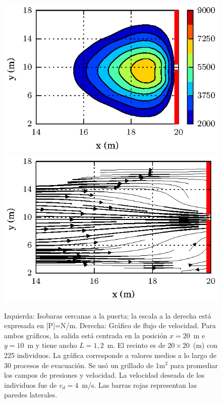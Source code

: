 \begin{figure}[H]
    \centering
    \includegraphics[scale=1]{figuras/fig4_version0.eps}
    \hfill
        \includegraphics[scale=1]{figuras/flujo_door_1_2m.eps}
    \caption[width=5cm]{Izquierda: Isobaras cercanas a la puerta; la escala a la derecha está expresada en [P]=N/m. Derecha: Gráfico de flujo de velocidad. Para ambos gráficos, la salida está centrada en la posición $x=20$~m e $y=10$~m y tiene ancho $L=1,2$~m. El recinto es de $20\times 20$~(m) con 225 individuos. La gráfica corresponde a valores medios a lo largo de 30 procesos de evacuación. Se usó un grillado de 1m$^2$ para promediar los campos de presiones y velocidad. La velocidad deseada de los individuos fue de $v_d=4$~m/s. Las barras rojas representan las paredes laterales.}
    \label{isobaras_flujo_1_2m}
\end{figure}

